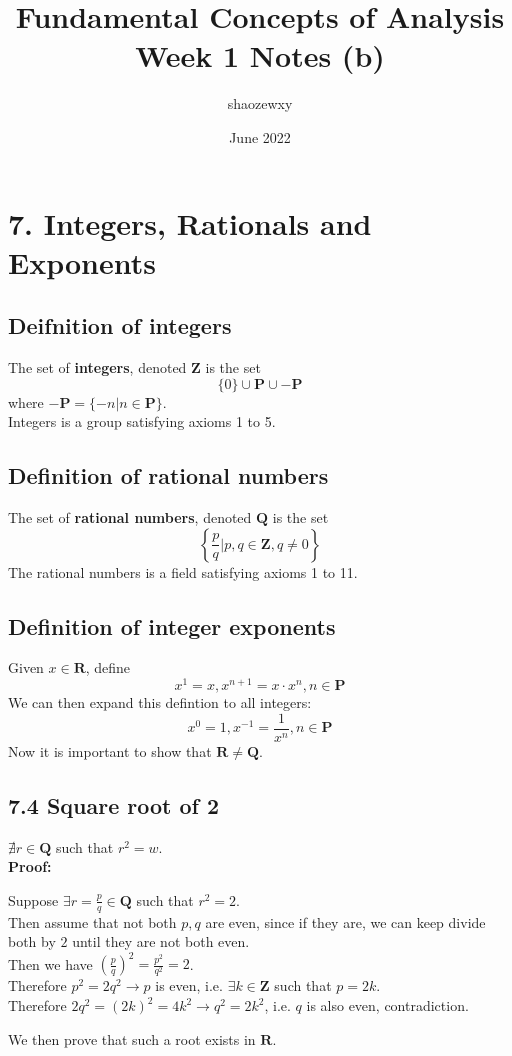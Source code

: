 \documentclass{article}
\title{Fundamental Concepts of Analysis\\
\large{Week 1 Notes (b)}}
\author{shaozewxy }
\date{June 2022}
\begin{document}
\maketitle
\section*{7. Integers, Rationals and Exponents}
\subsection*{Deifnition of integers}
The set of \textbf{integers}, denoted $\mathbf{Z}$ is the set
\begin{equation*}
    \{0\}\cup \mathbf{P} \cup -\mathbf{P}
\end{equation*}
where $-\mathbf{P} = \{-n | n \in \mathbf{P}\}$.\\
Integers is a group satisfying axioms 1 to 5.
\subsection*{Definition of rational numbers}
The set of \textbf{rational numbers}, denoted $\mathbf{Q}$ is the set
\begin{equation*}
    \left\{
        \frac{p}{q} | p, q \in \mathbf{Z}, q \neq 0
    \right\}
\end{equation*}
The rational numbers is a field satisfying axioms 1 to 11.
\subsection*{Definition of integer exponents}
Given $x \in \mathbf{R}$, define
\begin{equation*}
    x^1 = x, x^{n+1} = x\cdot x^n, n \in \mathbf{P}
\end{equation*}
We can then expand this defintion to all integers:
\begin{equation*}
    x^0 = 1, x^{-1} = \frac{1}{x^n}, n \in \mathbf{P}
\end{equation*}
Now it is important to show that $\mathbf{R} \neq \mathbf{Q}$.
\subsection*{7.4 Square root of 2}
$\nexists r \in \mathbf{Q}$ such that $r^2 = w$.\\
\textbf{Proof:}
\begin{addmargin}[1em]{0em}
    Suppose $\exists r = \frac{p}{q} \in \mathbf{Q}$ such that $r^2 = 2$.\\
    Then assume that not both $p, q$ are even, since if they are, we can keep divide both by $2$ until they are not both even.\\
    Then we have $(\frac{p}{q})^2 = \frac{p^2}{q^2} = 2$.\\
    Therefore $p^2 = 2q^2 \rightarrow p$ is even, i.e. $\exists k \in \mathbf{Z}$ such that $p  = 2k$.\\
    Therefore $2q^2 = (2k)^2 = 4k^2 \rightarrow q^2 = 2k^2$, i.e. $q$ is also even, contradiction.
\end{addmargin}
We then prove that such a root exists in $\mathbf{R}$.
\end{document}
